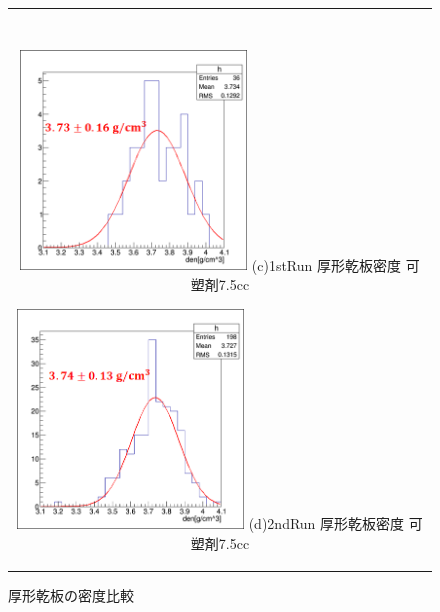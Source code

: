 \documentclass[12pt,a4paper]{jarticle}
\begin{document}
\begin{figure}[htbp]
\begin{center}
\begin{tabular}{c}
	　\\
        \begin{minipage}{0.5\hsize}
            \begin{center}
              \includegraphics[clip, width=60mm]{1stRun_thin_den.png}
              \hspace{1.6cm} (c)1stRun 厚形乾板密度 可塑剤7.5cc
            \end{center}
          \end{minipage}
          
        \begin{minipage}{0.5\hsize}
            \begin{center}
              \includegraphics[clip, width=60mm]{2ndRun_thin_den.png}
              \hspace{1.6cm} (d)2ndRun 厚形乾板密度 可塑剤7.5cc
            \end{center}
        \end{minipage}
    
      \end{tabular}
      \caption{厚形乾板の密度比較\label{fig:compare_thick_den}}
    \end{center}
\end{figure}
\end{document}
